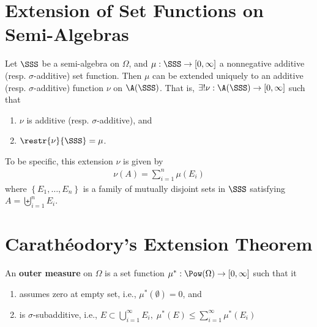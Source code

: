 \documentclass[thmcnt=section, 12pt]{elegantbook}
\begin{document}

\begin{proposition} \label{pro:3}
\end{proposition}


\section{Extension of Set Functions on Semi-Algebras}


\begin{theorem} \label{thm:1}
    Let $\SSS$ be a semi-algebra on $\Omega$, and $\mu: \SSS \to [0, \infty]$ a nonnegative additive (resp. $\sigma$-additive) set function. Then $\mu$ can be extended uniquely to an additive (resp. $\sigma$-additive) function $\nu$ on $\A(\SSS)$. That is, $\exists! \nu: \A(\SSS) \to [0, \infty]$ such that
    \begin{enumerate}
        \item $\nu$ is additive (resp. $\sigma$-additive), and 
        \item $\restr{\nu}{\SSS} = \mu$.
    \end{enumerate}
    To be specific, this extension $\nu$ is given by 
    \begin{align*}
        \nu(A) = \sum_{i=1}^n \mu(E_i)
    \end{align*}
    where $\left\{E_1, \ldots, E_n\right\}$ is a family of mutually disjoint sets in $\SSS$ satisfying $A = \biguplus_{i=1}^n E_i$.
\end{theorem}


\section{Carathéodory's Extension Theorem}


\begin{definition} \label{def:1} %
    An \textbf{outer measure} on $ \Omega $ is a set function $ \mu^\ast : \Pow(\Omega) \to [0, \infty] $ such that it
    \begin{enumerate}
        \item assumes zero at empty set, i.e., $ \mu^\ast(\emptyset) = 0 $, and
        \item is $ \sigma $-subadditive, i.e., $ E \subset \bigcup_{i=1}^\infty {E_i}, \; \mu^\ast(E) \leq \sum_{i=1}^\infty {\mu^\ast(E_i)} $
    \end{enumerate}
\end{definition}
\end{document}
